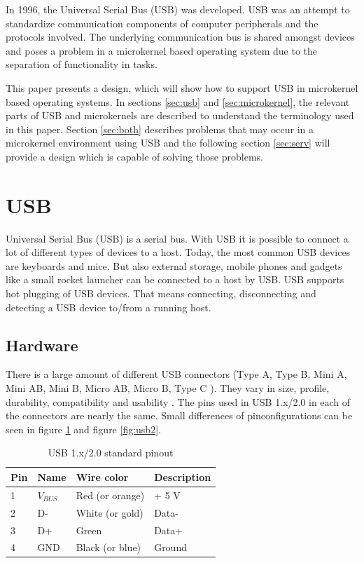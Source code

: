 \documentclass{acm_proc_article-sp}
\begin{document}
In 1996, the Universal Serial Bus (USB) was developed.
USB was an attempt to standardize communication components of computer peripherals and
the protocols involved.
The underlying communication bus is shared amongst devices and poses a problem in a microkernel based
operating system due to the separation of functionality in tasks.

This paper presents a design, which will show how to support USB in microkernel based operating systems.
In sections \ref{sec:usb} and \ref{sec:microkernel}, the relevant parts of USB and microkernels are described
to understand the terminology used in this paper.
Section \ref{sec:both} describes problems that may occur in a microkernel environment using USB and the following
section \ref{sec:serv} will provide a design which is capable of solving those problems.

\section{USB}
Universal Serial Bus (USB) is a serial bus.
With USB it is possible to connect a lot of different types of devices to a host.
Today, the most common USB devices are keyboards and mice.
But also external storage, mobile phones and gadgets like a small rocket launcher can be connected to a host by USB.
USB supports hot plugging of USB devices.
That means connecting, disconnecting and detecting a USB device to/from a running host.

\subsection{Hardware}
There is a large amount of different USB connectors (Type A, Type B, Mini A, Mini AB, Mini B, Micro AB, Micro B, Type C \cite{usborg}).
They vary in size, profile, durability, compatibility and usability \cite{dowell}.
The pins used in USB 1.x/2.0 in each of the connectors are nearly the same.
Small differences of pinconfigurations can be seen in figure \ref{fig:usb1} and figure  \ref{fig:usb2}.

\begin{table}
\centering
\caption{USB 1.x/2.0 standard pinout}
\label{fig:usb1}
\begin{tabular}{|l|l|l|l|} \hline
Pin & Name & Wire color & Description\\ \hline
1 & $V_{BUS}$ & Red (or orange) & + 5 V\\ \hline
2 & D- & White (or gold) & Data-\\ \hline
3 & D+ & Green & Data+\\ \hline
4 & GND & Black (or blue) & Ground\\ \hline
\end{tabular}
\end{table}
\end{document}

